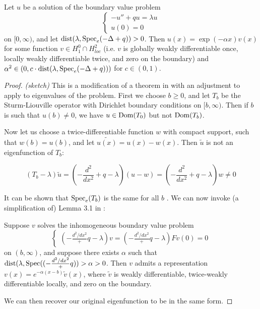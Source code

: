 \documentclass[../main.tex]{subfiles}
\begin{document}
\begin{theorem}
  Let $u$ be a solution of the boundary value problem 
    $$ 
    \begin{cases}
	-u'' + qu = \lambda u \\
	u(0) = 0
    \end{cases} 
    $$ 
  on $[0, \infty)$, and let $\mathrm{dist}(\lambda, \mathrm{Spec}_e(-\Delta + q)) > 0$.
  Then $u(x) = \exp(-\alpha x) v(x)$ for some function $v \in H_1^0 \cap H^2_{loc}$
  (i.e. $v$ is globally weakly differentiable once, locally weakly differentiable twice,
  and zero on the boundary) and 
  $\alpha^2 \in (0, c\cdot\mathrm{dist}(\lambda, \mathrm{Spec}_e(-\Delta + q)))$
  for $c \in (0, 1)$.
\end{theorem}
\begin{proof}\emph{(sketch)}
This is a modification of a theorem in \cite{aljawi2023eigenvalues} with an adjustment
to apply to eigenvalues of the problem. First we choose $b \geq 0$, and let $T_{b}$
be the Sturm-Liouville operator with Dirichlet boundary conditions on $[b, \infty)$.
Then if $b$ is such that $u(b) \neq 0$, we have $u \in \mathrm{Dom}(T_0)$ but not $\mathrm{Dom}(T_b)$.

Now let us choose a twice-differentiable function $w$ with compact support, such that
$w(b) = u(b)$, and let $\tilde{u(x)} = u(x) - w(x)$. Then $\tilde{u}$ is not an
eigenfunction of $T_b$:

  $$(T_b - \lambda)\tilde{u} 
    = (-\frac{d^2}{dx^2} + q - \lambda)(u - w)
    = (-\frac{d^2}{dx^2} + q - \lambda)w \neq 0$$

It can be shown that $\mathrm{Spec}_e(T_b)$ is the same for all $b$ \cite{akhiezer2013theory}.
  We can now invoke (a simplification of) Lemma 3.1 in \cite{aljawi2023eigenvalues}:
\begin{displayquote}
  Suppose $v$ solves the inhomogeneous boundary value problem
  $$
  \begin{cases}
    (-\frac{d^2/dx^2} + q - \lambda)v = (-\frac{d^2/dx^2} + q - \lambda)F
    v(0) = 0
  \end{cases}
  $$
  on $(b, \infty)$, and suppose there exists $\alpha$ such that
  $\mathrm{dist}(\lambda, \mathrm{Spec}((-\frac{d^2/dx^2} + q)) > \alpha > 0$.
  Then $v$ admits a representation $v(x) = e^{-\alpha(x-b)}\tilde{v}(x)$, where
  $\tilde{v}$ is weakly differentiable, twice-weakly differentiable locally,
  and zero on the boundary.
\end{displayquote}
We can then recover our original eigenfunction to be in the same form.
\end{proof}
\end{document}

